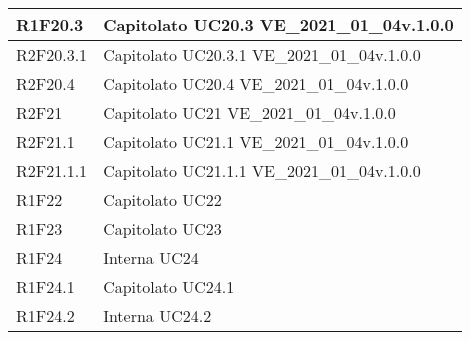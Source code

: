 \begin{center}
\begin{longtable}{|p{22mm}|p{44mm}|}
R1F20.3 &
Capitolato \newline
UC20.3 \newline
VE\_2021\_01\_04v.1.0.0 \newline
\\
\hline

R2F20.3.1 &
Capitolato \newline
UC20.3.1 \newline
VE\_2021\_01\_04v.1.0.0 \newline
\\
\hline

R2F20.4 &
Capitolato \newline
UC20.4 \newline
VE\_2021\_01\_04v.1.0.0 \newline
\\
\hline

R2F21 &
Capitolato \newline
UC21 \newline
VE\_2021\_01\_04v.1.0.0 \newline
\\
\hline

R2F21.1 &
Capitolato \newline
UC21.1 \newline
VE\_2021\_01\_04v.1.0.0 \newline
\\
\hline

R2F21.1.1 &
Capitolato \newline
UC21.1.1 \newline
VE\_2021\_01\_04v.1.0.0 \newline
\\
\hline

R1F22 &
Capitolato \newline
UC22 \newline
\\
\hline

R1F23 &
Capitolato \newline
UC23 \newline
\\
\hline

R1F24 &
Interna \newline
UC24 \newline
\\
\hline

R1F24.1 &
Capitolato \newline
UC24.1 \newline
\\
\hline

R1F24.2 &
Interna \newline
UC24.2 \newline
\\
\hline


\end{longtable}
\end{center}
